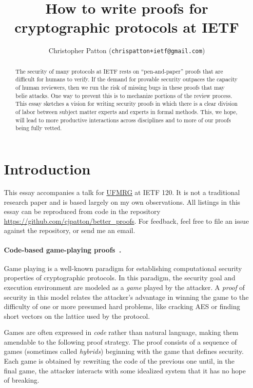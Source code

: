 \documentclass{article}
\title{How to write proofs for cryptographic protocols at IETF}
\author{Christopher Patton ({\texttt{\small chrispatton+ietf@gmail.com}})}
\begin{document}
\maketitle

\begin{abstract}

  The security of many protocols at IETF rests on ``pen-and-paper'' proofs that
  are difficult for humans to verify.
  If the demand for provable security outpaces the capacity of human reviewers,
  then we run the risk of missing bugs in these proofs that may belie attacks.
  One way to prevent this is to mechanize portions of the review process.
  This essay sketches a vision for writing security proofs in which there is a
  clear division of labor between subject matter experts and experts in formal
  methods.
  This, we hope, will lead to more productive interactions across disciplines
  and to more of our proofs being fully vetted.

\end{abstract}

\section{Introduction}\label{sec/intro}

This essay accompanies a talk for
\href{https://datatracker.ietf.org/group/ufmrg/about/}{UFMRG} at IETF 120.
%
It is not a traditional research paper and is based largely on my own
observations.
%
All listings in this essay can be reproduced from code in the repository
\url{https://github.com/cjpatton/better_proofs}.
%
For feedback, feel free to file an issue against the repository, or send me an
email.


\paragraph{Code-based game-playing proofs~\cite{BR06}.}
%
Game playing is a well-known paradigm for establishing computational security
properties of cryptographic protocols.
%
In this paradigm, the security goal and execution environment are modeled as a
\emph{game} played by the attacker. A \emph{proof} of security in this model
relates the attacker's advantage in winning the game to the difficulty of one
or more presumed hard problems, like cracking AES or finding short vectors on
the lattice used by the protocol.

Games are often expressed in \emph{code} rather than natural language, making
them amendable to the following proof strategy.
%
The proof consists of a sequence of games (sometimes called \emph{hybrids})
beginning with the game that defines security.
%
Each game is obtained by rewriting the code of the previous one until, in the
final game, the attacker interacts with some idealized system that it has no
hope of breaking.
\end{document}
